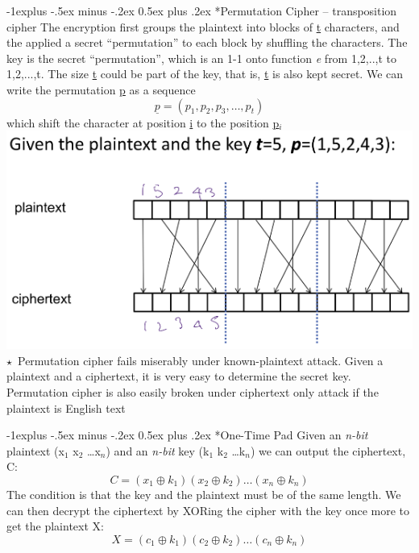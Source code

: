 \documentclass[10pt,landscape]{article}
\makeatletter
\renewcommand{\subsection}{\@startsection{subsection}{2}{0mm}%
                                {-1explus -.5ex minus -.2ex}%
                                {0.5ex plus .2ex}%
                                {\normalfont\normalsize\bfseries}}
\makeatother
\begin{document}
\begin{multicols*}{3}
\subsection*{Permutation Cipher -- transposition cipher}
The encryption first groups the plaintext into blocks of \underline{t} characters, and the applied a secret “permutation” to each 
block by shuffling the characters. The key is the secret “permutation”, which is an 1-1 onto function \textit{e} from
{1,2,..,t} to {1,2,...,t}. The size \underline{t} could be part of the key, that is, \underline{t} is also kept
secret. We can write the permutation \underline{p} as a sequence 
\begin{equation}
    \underline{p} = (p_1, p_2, p_3, \ldots, p_t)
\end{equation}
which shift the character at position \underline{i} to the position \underline{p$_i$} \newline
\includegraphics[scale=0.8]{images/permutationcipher.png} \newline
$\star$\ Permutation cipher fails miserably under known-plaintext attack. Given a plaintext and a ciphertext, it is very 
easy to determine the secret key. Permutation cipher is also easily broken under ciphertext only attack if the plaintext 
is English text

\subsection*{One-Time Pad}
Given an \textit{n-bit} plaintext (x$_1$ x$_2$ \ldots x$_n$) and an \textit{n-bit} key (k$_1$ k$_2$ \ldots k$_n$) we can output the ciphertext, C:
\begin{equation}
    C = (x_1 \oplus k_1)(x_2 \oplus k_2)\ldots (x_n \oplus k_n) 
\end{equation}
The condition is that the key and the plaintext must be of the same length. We can then decrypt the ciphertext by XORing the cipher with the
key once more to get the plaintext X:
\begin{equation}
    X = (c_1 \oplus k_1)(c_2 \oplus k_2)\ldots (c_n \oplus k_n) 
\end{equation}


\end{multicols*}
\end{document}
